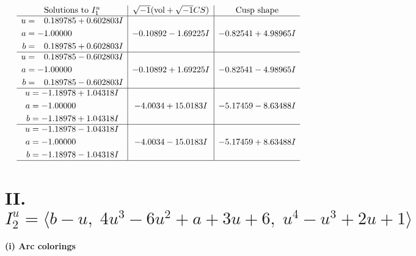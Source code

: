 \documentclass[1p]{elsarticle_modified}
\theoremstyle{definition}
\newcommand{\I}{\sqrt{-1}}
\begin{document}
$$\begin{array}{c|c|c}  
\text{Solutions to }I^u_{1}& \I (\text{vol} + \sqrt{-1}CS) & \text{Cusp shape}\\
 \hline 
\begin{aligned}
u &= \phantom{-}0.189785 + 0.602803 I \\
a &= -1.00000\phantom{ +0.000000I} \\
b &= \phantom{-}0.189785 + 0.602803 I\end{aligned}
 & -0.10892 - 1.69225 I & -0.82541 + 4.98965 I \\ \hline\begin{aligned}
u &= \phantom{-}0.189785 - 0.602803 I \\
a &= -1.00000\phantom{ +0.000000I} \\
b &= \phantom{-}0.189785 - 0.602803 I\end{aligned}
 & -0.10892 + 1.69225 I & -0.82541 - 4.98965 I \\ \hline\begin{aligned}
u &= -1.18978 + 1.04318 I \\
a &= -1.00000\phantom{ +0.000000I} \\
b &= -1.18978 + 1.04318 I\end{aligned}
 & -4.0034 + 15.0183 I & -5.17459 - 8.63488 I \\ \hline\begin{aligned}
u &= -1.18978 - 1.04318 I \\
a &= -1.00000\phantom{ +0.000000I} \\
b &= -1.18978 - 1.04318 I\end{aligned}
 & -4.0034 - 15.0183 I & -5.17459 + 8.63488 I\\
 \hline 
 \end{array}$$\newpage\newpage\renewcommand{\arraystretch}{1}
\centering \section*{II. $I^u_{2}= \langle b- u,\;4 u^3-6 u^2+a+3 u+6,\;u^4- u^3+2 u+1 \rangle$}
\flushleft \textbf{(i) Arc colorings}\\
\end{document}
